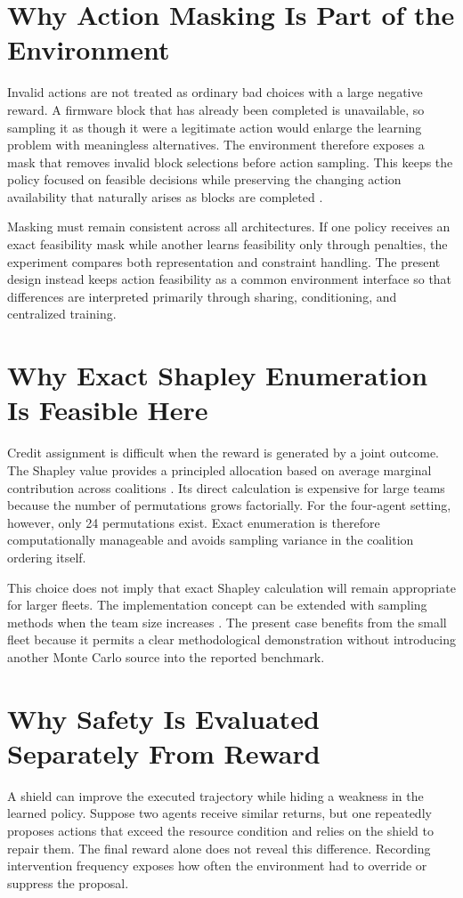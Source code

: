 \documentclass{iutbscthesis}
\begin{document}
\begin{appendices}
\section{Why Action Masking Is Part of the Environment}
Invalid actions are not treated as ordinary bad choices with a large negative reward. A firmware block that has already been completed is unavailable, so sampling it as though it were a legitimate action would enlarge the learning problem with meaningless alternatives. The environment therefore exposes a mask that removes invalid block selections before action sampling. This keeps the policy focused on feasible decisions while preserving the changing action availability that naturally arises as blocks are completed \parencite{huang2022masking}.

Masking must remain consistent across all architectures. If one policy receives an exact feasibility mask while another learns feasibility only through penalties, the experiment compares both representation and constraint handling. The present design instead keeps action feasibility as a common environment interface so that differences are interpreted primarily through sharing, conditioning, and centralized training.

\section{Why Exact Shapley Enumeration Is Feasible Here}
Credit assignment is difficult when the reward is generated by a joint outcome. The Shapley value provides a principled allocation based on average marginal contribution across coalitions \parencite{shapley1953value}. Its direct calculation is expensive for large teams because the number of permutations grows factorially. For the four-agent setting, however, only 24 permutations exist. Exact enumeration is therefore computationally manageable and avoids sampling variance in the coalition ordering itself.

This choice does not imply that exact Shapley calculation will remain appropriate for larger fleets. The implementation concept can be extended with sampling methods when the team size increases \parencite{castro2009shapley}. The present case benefits from the small fleet because it permits a clear methodological demonstration without introducing another Monte Carlo source into the reported benchmark.

\section{Why Safety Is Evaluated Separately From Reward}
A shield can improve the executed trajectory while hiding a weakness in the learned policy. Suppose two agents receive similar returns, but one repeatedly proposes actions that exceed the resource condition and relies on the shield to repair them. The final reward alone does not reveal this difference. Recording intervention frequency exposes how often the environment had to override or suppress the proposal.


\end{appendices}
\end{document}
